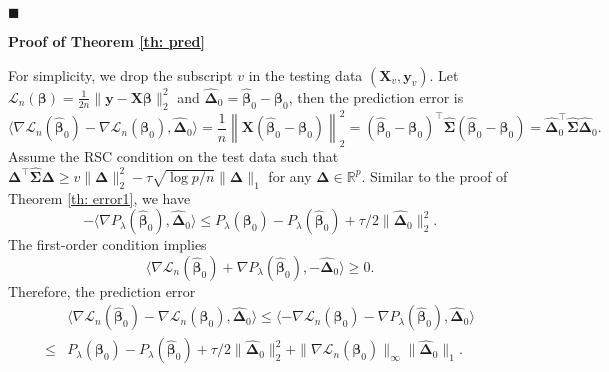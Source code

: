 \documentclass[twoside,12pt]{article}
\newcommand{\mb}[1]{\boldsymbol{\mathbf{#1}}}
\newcommand{\wh}[1]{\widehat{#1}}
\begin{document}
$\blacksquare$
\vskip5mm


\textbf{Proof of Theorem \ref{th: pred}}

For simplicity, we drop the subscript $v$ in the testing data $(\mb X_v, \mb y_v)$.
Let $\mathcal L_n(\mb\beta)=\frac1{2n}\|\mb y-\mb X\mb\beta\|_2^2$ and $\wh{\mb\Delta}_0=\wh{\mb\beta}_0-\mb\beta_0$, then the prediction error is $$\langle\nabla\mathcal L_n(\wh{\mb\beta}_0)-\nabla\mathcal L_n(\mb\beta_0), \wh{\mb\Delta}_0\rangle=\frac1n\left\|\mb X(\wh{\mb\beta}_0-\mb\beta_0)\right\|_2^2=(\wh{\mb\beta}_0-\mb\beta_0)^\top \wh{\mb\Sigma}(\wh{\mb\beta}_0-\mb\beta_0)=\wh{\mb\Delta}_0^\top\wh{\mb\Sigma}\wh{\mb\Delta}_0.$$
Assume the RSC condition on the test data such that
$\mb\Delta^\top\wh{\mb\Sigma}\mb\Delta\geq v\|\mb\Delta\|_2^2-\tau\sqrt{\log p/n}\|\mb\Delta\|_1$ for any $\mb\Delta\in\mathbb{R}^p$.
Similar to the proof of Theorem \ref{th: error1}, we have
$$-\langle\nabla P_{\lambda}(\wh{\mb\beta}_0),\wh{\mb\Delta}_0\rangle\leq P_{\lambda}(\mb\beta_0)-P_{\lambda}(\wh{\mb\beta}_0)+\tau/2\|\wh{\mb\Delta}_0\|_2^2.$$
The first-order condition implies
$$\langle\nabla \mathcal L_n(\wh{\mb\beta}_0)+\nabla P_{\lambda}(\wh{\mb\beta}_0),-\wh{\mb\Delta}_0\rangle\geq 0.$$
Therefore, the prediction error
\begin{equation*}
	\begin{aligned}
		&\langle\nabla\mathcal L_n(\wh{\mb\beta}_0)-\nabla\mathcal L_n(\mb\beta_0), \wh{\mb\Delta}_0\rangle\leq \langle-\nabla \mathcal L_n(\mb\beta_0)-\nabla P_{\lambda}(\wh{\mb\beta}_0),\wh{\mb\Delta}_0\rangle\\
		\leq & P_{\lambda}(\mb\beta_0)-P_{\lambda}(\wh{\mb\beta}_0)+\tau/2\|\wh{\mb\Delta}_0\|_2^2+\|\nabla\mathcal L_n(\mb\beta_0)\|_{\infty}\|\wh{\mb\Delta}_0\|_1.
	\end{aligned}
\end{equation*}
\end{document}
